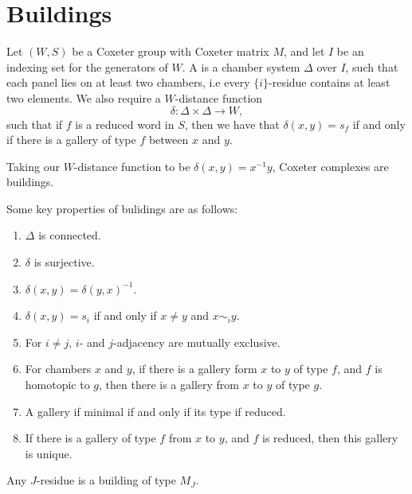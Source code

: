\documentclass[11pt]{article}
\begin{document}
\section{Buildings}

\begin{definition}
    Let $(W,S)$ be a Coxeter group with Coxeter matrix $M$, and let $I$ be an indexing set for the generators of $W$. A  is a chamber system $\Delta$ over $I$, such that each panel lies on at least two chambers, i.e every $\{i\}$-residue contains at least two elements. We also require a $W$-distance function
    \[\delta:\Delta\times \Delta \to W,\]
    such that if $f$ is a reduced word in $S$, then we have that $\delta(x,y)=s_f$ if and only if there is a gallery of type $f$ between $x$ and $y$. 
\end{definition}


\begin{example}
    Taking our $W$-distance function to be $\delta(x,y)=x^{-1}y$, Coxeter complexes are buildings.
\end{example}


Some key properties of bulidings are as follows:
\begin{enumerate}
    \item $\Delta$ is connected.
    \item $\delta$ is surjective.
    \item $\delta(x,y)=\delta(y,x)^{-1}$.
    \item $\delta(x,y)=s_i$ if and only if $x\neq y$ and $x\sim_i y$.
    \item For $i\neq j$, $i$- and $j$-adjacency are mutually exclusive.
    \item For chambers $x$ and $y$, if there is a gallery form $x$ to $y$ of type $f$, and $f$ is homotopic to $g$, then there is a gallery from $x$ to $y$ of type $g$. 
    \item A gallery if minimal if and only if its type if reduced.
    \item If there is a gallery of type $f$ from $x$ to $y$, and $f$ is reduced, then this gallery is unique.
\end{enumerate}

\begin{theorem}
    Any $J$-residue is a building of type $M_J$. 
\end{theorem}
\end{document}
